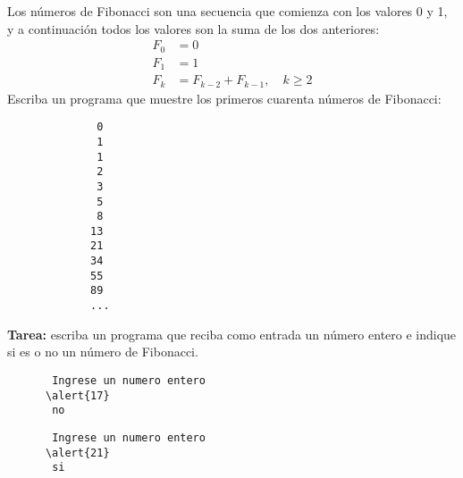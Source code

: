 \documentclass[10pt]{beamer}
\begin{document}
  \begin{frame}[fragile]
    Los números de Fibonacci son una secuencia que comienza
    con los valores 0 y 1, y a continuación todos los valores
    son la suma de los dos anteriores:
    \begin{align*}
      F_0 &= 0 \\
      F_1 &= 1 \\
      F_k &= F_{k - 2} + F_{k - 1},\quad k\ge 2
    \end{align*}
    Escriba un programa que muestre
    los primeros cuarenta números de Fibonacci:

    \begin{Verbatim}
              0
              1
              1
              2
              3
              5
              8
             13
             21
             34
             55
             89
             ...
    \end{Verbatim}

\end{frame}

  \begin{frame}
    
  \end{frame}

  \begin{frame}[fragile]
    \textbf{Tarea:}
    escriba un programa que reciba como entrada un número entero
    e indique si es o no un número de Fibonacci.

    \begin{Verbatim}
       Ingrese un numero entero
      \alert{17}
       no
    \end{Verbatim}

    \begin{Verbatim}
       Ingrese un numero entero
      \alert{21}
       si
    \end{Verbatim}

\end{frame}
\end{document}
